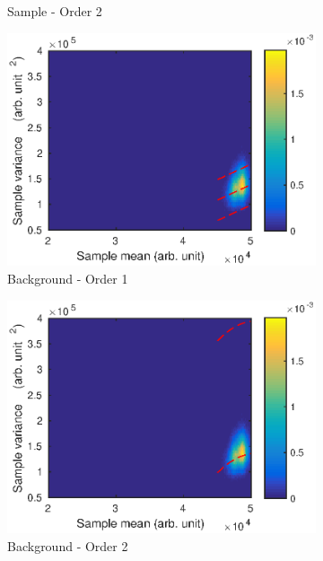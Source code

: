 \documentclass[12pt]{report}
\begin{document}
\begin{figure}
\begin{subfigure}{0.45\textwidth}
		\caption{Sample - Order 2}
	\end{subfigure}
	\begin{subfigure}{0.45\textwidth}
		\includegraphics[width=\textwidth]{figures/meanVar/subsample_background1.eps}
		\caption{Background - Order 1}
	\end{subfigure}
	\begin{subfigure}{0.45\textwidth}
		\includegraphics[width=\textwidth]{figures/meanVar/subsample_background2.eps}
		\caption{Background - Order 2}
	\end{subfigure}
	\begin{subfigure}{0.45\textwidth}

\end{subfigure}
\end{figure}
\end{document}
